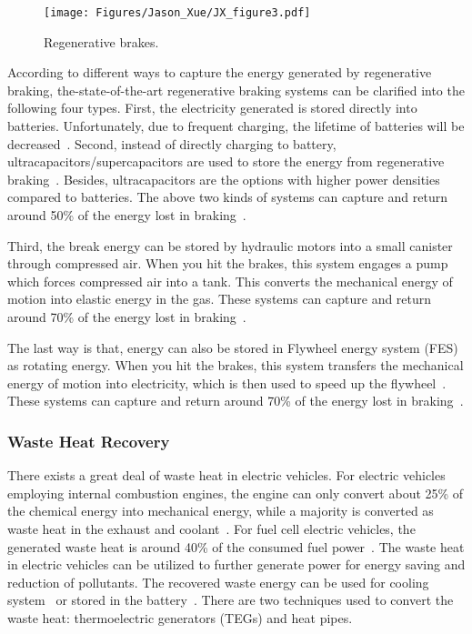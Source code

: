 \begin{figure}
\centering
\texttt{[image: Figures/Jason\_Xue/JX\_figure3.pdf]}
\caption{Regenerative brakes.}
\label{JX_image3}
\end{figure}      

According to different ways to capture the energy generated by regenerative braking, the-state-of-the-art regenerative braking systems can be clarified into the following four types. First, the electricity generated is stored directly into batteries. Unfortunately, due to frequent charging, the lifetime of batteries will be decreased~\cite{JX_12,JX_45}. Second, instead of directly charging to battery, ultracapacitors/supercapacitors are used to store the energy from regenerative braking~\cite{JX_11,JX_31}. Besides, ultracapacitors are the options with higher power densities compared to batteries. The above two kinds of systems can capture and return around 50\% of the energy lost in braking~\cite{JX_48,JX_65}.

Third, the break energy can be stored by hydraulic motors into a small canister through compressed air. When you hit the brakes, this system engages a pump which forces compressed air into a tank. This converts the mechanical energy of motion into elastic energy in the gas. These systems can capture and return around 70\% of the energy lost in braking~\cite{JX_30,JX_58}.

The last way is that, energy can also be stored in Flywheel energy system (FES) as rotating energy. When you hit the brakes, this system transfers the mechanical energy of motion into electricity, which is then used to speed up the flywheel~\cite{JX_16,JX_25,JX_70}. These systems can capture and return around 70\% of the energy lost in braking~\cite{JX_48}.

\subsubsection{Waste Heat Recovery}

There exists a great deal of waste heat in electric vehicles. For electric vehicles employing internal combustion engines, the engine can only convert about 25\% of the chemical energy into mechanical energy, while a majority is converted as waste heat in the exhaust and coolant~\cite{JX_37,JX_43,JX_55}. 
For fuel cell electric vehicles, the generated waste heat is around 40\% of the consumed fuel power~\cite{JX_51_1}. The waste heat in electric vehicles can be utilized to further generate power for energy saving and reduction of pollutants. The recovered waste energy can be used for cooling system~\cite{JX_29} or stored in the battery~\cite{JX_71}. There are two techniques used to convert the waste heat: thermoelectric generators (TEGs) and heat pipes.

